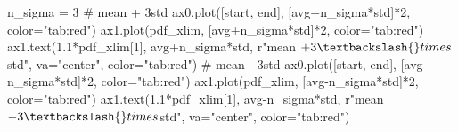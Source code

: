 \documentclass[
  letterpaper,
  DIV=11,
  numbers=noendperiod,
  oneside]{scrreprt}
\newenvironment{Shaded}{\begin{snugshade}}{\end{snugshade}}
\newcommand{\CommentTok}[1]{\textcolor[rgb]{0.37,0.37,0.37}{#1}}
\newcommand{\DecValTok}[1]{\textcolor[rgb]{0.68,0.00,0.00}{#1}}
\newcommand{\FloatTok}[1]{\textcolor[rgb]{0.68,0.00,0.00}{#1}}
\newcommand{\NormalTok}[1]{\textcolor[rgb]{0.00,0.23,0.31}{#1}}
\newcommand{\OperatorTok}[1]{\textcolor[rgb]{0.37,0.37,0.37}{#1}}
\newcommand{\StringTok}[1]{\textcolor[rgb]{0.13,0.47,0.30}{#1}}
\newcommand{\VerbatimStringTok}[1]{\textcolor[rgb]{0.13,0.47,0.30}{#1}}
\begin{document}
\begin{Shaded}
\begin{Highlighting}[]
\NormalTok{n\_sigma }\OperatorTok{=} \DecValTok{3}
\CommentTok{\# mean + 3std}
\NormalTok{ax0.plot([start, end], [avg}\OperatorTok{+}\NormalTok{n\_sigma}\OperatorTok{*}\NormalTok{std]}\OperatorTok{*}\DecValTok{2}\NormalTok{, color}\OperatorTok{=}\StringTok{"tab:red"}\NormalTok{)}
\NormalTok{ax1.plot(pdf\_xlim, [avg}\OperatorTok{+}\NormalTok{n\_sigma}\OperatorTok{*}\NormalTok{std]}\OperatorTok{*}\DecValTok{2}\NormalTok{, color}\OperatorTok{=}\StringTok{"tab:red"}\NormalTok{)}
\NormalTok{ax1.text(}\FloatTok{1.1}\OperatorTok{*}\NormalTok{pdf\_xlim[}\DecValTok{1}\NormalTok{], avg}\OperatorTok{+}\NormalTok{n\_sigma}\OperatorTok{*}\NormalTok{std, }\VerbatimStringTok{r"mean $+3\textbackslash{}times$std"}\NormalTok{, va}\OperatorTok{=}\StringTok{"center"}\NormalTok{, color}\OperatorTok{=}\StringTok{"tab:red"}\NormalTok{)}
\CommentTok{\# mean {-} 3std}
\NormalTok{ax0.plot([start, end], [avg}\OperatorTok{{-}}\NormalTok{n\_sigma}\OperatorTok{*}\NormalTok{std]}\OperatorTok{*}\DecValTok{2}\NormalTok{, color}\OperatorTok{=}\StringTok{"tab:red"}\NormalTok{)}
\NormalTok{ax1.plot(pdf\_xlim, [avg}\OperatorTok{{-}}\NormalTok{n\_sigma}\OperatorTok{*}\NormalTok{std]}\OperatorTok{*}\DecValTok{2}\NormalTok{, color}\OperatorTok{=}\StringTok{"tab:red"}\NormalTok{)}
\NormalTok{ax1.text(}\FloatTok{1.1}\OperatorTok{*}\NormalTok{pdf\_xlim[}\DecValTok{1}\NormalTok{], avg}\OperatorTok{{-}}\NormalTok{n\_sigma}\OperatorTok{*}\NormalTok{std, }\VerbatimStringTok{r"mean ${-}3\textbackslash{}times$std"}\NormalTok{, va}\OperatorTok{=}\StringTok{"center"}\NormalTok{, color}\OperatorTok{=}\StringTok{"tab:red"}\NormalTok{)}


\end{Highlighting}
\end{Shaded}
\end{document}
